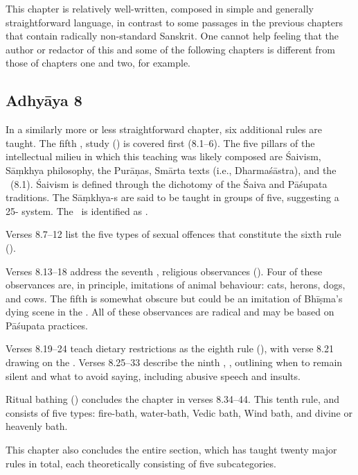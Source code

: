 This chapter is relatively well-written, composed in simple and generally
straightforward language, in contrast to some passages in the previous
chapters that contain radically non-standard Sanskrit. One cannot help feeling that the
author or redactor of this and some of the following chapters is different
from those of chapters one and two, for example.



\subsection*{Adhyāya 8}\label{contents_of_ch08}
In a similarly more or less straightforward chapter, six additional 
 rules are taught. The fifth , study () 
is covered first (8.1--6). The five pillars of the intellectual
milieu in which this teaching was likely composed are
Śaivism, Sāṃkhya philosophy, the Purāṇas, Smārta texts (i.e., Dharmaśāstra),
and the \MBh\ (8.1). Śaivism is defined through the dichotomy of the Śaiva and Pāśupata
traditions. The Sāṃkhya-s are said to be taught in groups of five,
suggesting a 25- system. The \MBh\ is identified as . 

Verses 8.7--12 list the five types of sexual offences that constitute
the sixth  rule ().

Verses 8.13--18 address the seventh , religious
observances (). Four of these observances are, in principle, 
imitations of animal behaviour: cats, herons, dogs, and cows. The fifth is
somewhat obscure but could be an imitation of Bhīṣma's dying scene in the \MBh.
All of these observances are radical and may be based on Pāśupata practices.

Verses 8.19--24 teach dietary restrictions as the eighth  rule (),
with verse 8.21 drawing on the \MBh.
Verses 8.25--33 describe the ninth , , outlining
when to remain silent and what to avoid saying, including abusive speech and insults.

Ritual bathing () concludes the chapter in verses 8.34--44. This 
tenth  rule, and consists of five types: fire-bath, water-bath, Vedic bath,
Wind bath, and divine or heavenly bath.  

This chapter also concludes the entire section, which has
taught twenty major rules in total, each theoretically consisting of five subcategories.




